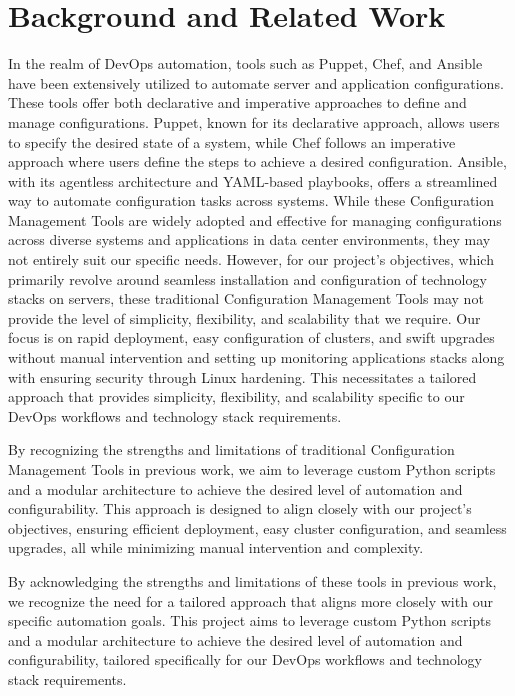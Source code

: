 \documentclass[12pt,a4paper,oneside]{report}
\begin{document}
 
\newpage
\chapter{Background and Related Work}
\hspace{1cm}
In the realm of DevOps automation, tools such as Puppet, Chef, and Ansible have been extensively utilized to automate server and application configurations. These tools offer both declarative and imperative approaches to define and manage configurations. Puppet, known for its declarative approach, allows users to specify the desired state of a system, while Chef follows an imperative approach where users define the steps to achieve a desired configuration. Ansible, with its agentless architecture and YAML-based playbooks, offers a streamlined way to automate configuration tasks across systems.
  While these Configuration Management Tools are widely adopted and effective for managing configurations across diverse systems and applications in data center environments, they may not entirely suit our specific needs.
However, for our project's objectives, which primarily revolve around seamless installation and configuration of technology stacks on servers, these traditional Configuration Management Tools may not provide the level of simplicity, flexibility, and scalability that we require. Our focus is on rapid deployment, easy configuration of clusters, and swift upgrades without manual intervention and setting up monitoring applications stacks along with ensuring security through Linux hardening. This necessitates a tailored approach that provides simplicity, flexibility, and scalability specific to our DevOps workflows and technology stack requirements.

  By recognizing the strengths and limitations of traditional Configuration Management Tools in previous work, we aim to leverage custom Python scripts and a modular architecture to achieve the desired level of automation and configurability. This approach is designed to align closely with our project's objectives, ensuring efficient deployment, easy cluster configuration, and seamless upgrades, all while minimizing manual intervention and complexity.

  By acknowledging the strengths and limitations of these tools in previous work, we recognize the need for a tailored approach that aligns more closely with our specific automation goals. This project aims to leverage custom Python scripts and a modular architecture to achieve the desired level of automation and configurability, tailored specifically for our DevOps workflows and technology stack requirements.
\end{document}
